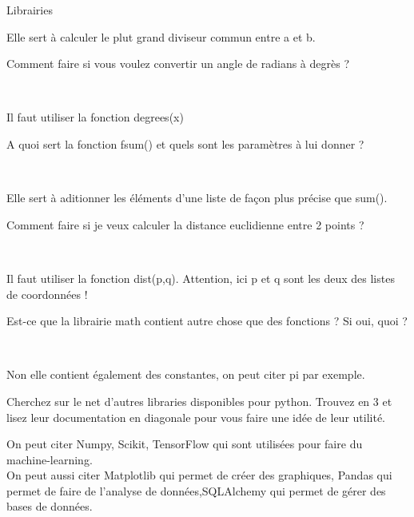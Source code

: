 \begin{section}{Librairies}
\begin{solution}
	Elle sert à calculer le plut grand diviseur commun entre a et b.
\end{solution} 

\begin{Exercice}[5 minutes]
	Comment faire si vous voulez convertir un angle de radians à degrès ? 
\end{Exercice} \\

\begin{solution}
	Il faut utiliser la fonction degrees(x)
\end{solution} 

\begin{Exercice}[5 minutes]
	A quoi sert la fonction fsum() et quels sont les paramètres à lui donner ? 
\end{Exercice} \\

\begin{solution}
	Elle sert à aditionner les éléments d'une liste de façon plus précise que sum().
\end{solution} 

\begin{Exercice}[5 minutes]
	Comment faire si je veux calculer la distance euclidienne entre 2 points ? 
\end{Exercice} \\

\begin{solution}
	Il faut utiliser la fonction dist(p,q). Attention, ici p et q sont les deux des listes de coordonnées !
\end{solution} 

\begin{Exercice}[5 minutes]
	Est-ce que la librairie math contient autre chose que des fonctions ? Si oui, quoi ? 
\end{Exercice} \\

\begin{solution}
	Non elle contient également des constantes, on peut citer pi par exemple.
\end{solution} 

\begin{Exercice}[10 minutes]
	Cherchez sur le net d'autres libraries disponibles pour python. Trouvez en 3 et lisez leur documentation en diagonale pour vous faire une idée de leur utilité.
\end{Exercice}    

\begin{solution}
	On peut citer Numpy, Scikit, TensorFlow qui sont utilisées pour faire du machine-learning. \\
	
	On peut aussi citer Matplotlib qui permet de créer des graphiques, Pandas qui permet de faire de l'analyse de données,SQLAlchemy qui permet de gérer des bases de données. \\
\end{solution} 
\end{section}





